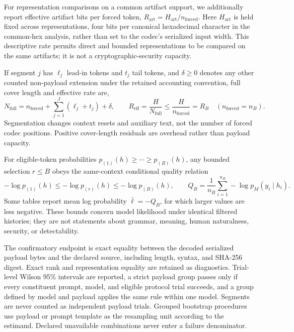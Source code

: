 \documentclass[fleqn,10pt]{wlscirep}
\begin{document}
For representation comparisons on a common artifact support, we additionally report effective artifact bits per forced token, \(R_{\mathrm{art}}=H_{\mathrm{art}}/n_{\mathrm{forced}}\). Here \(H_{\mathrm{art}}\) is held fixed across representations, four bits per canonical hexadecimal character in the common-hex analysis, rather than set to the codec's serialized input width. This descriptive rate permits direct and bounded representations to be compared on the same artifacts; it is not a cryptographic-security capacity.

If segment \(j\) has \(\ell_j\) lead-in tokens and \(t_j\) tail tokens, and \(\delta\ge0\) denotes any other counted non-payload extension under the retained accounting convention, full cover length and effective rate are,
\begin{equation}
N_{\mathrm{full}}
=n_{\mathrm{forced}}+\sum_{j=1}^{J}(\ell_j+t_j)+\delta,
\qquad
R_{\mathrm{eff}}=\frac{H}{N_{\mathrm{full}}}
\le\frac{H}{n_{\mathrm{forced}}}=R_B
\quad(n_{\mathrm{forced}}=n_B).
\label{eq:effective-rate}
\end{equation}
Segmentation changes context resets and auxiliary text, not the number of forced codec positions. Positive cover-length residuals are overhead rather than payload capacity.

For eligible-token probabilities \(p_{(1)}(h)\ge\cdots\ge p_{(B)}(h)\), any bounded selection \(r\le B\) obeys the same-context conditional quality relation
\begin{equation}
-\log p_{(1)}(h)
\le-\log p_{(r)}(h)
\le-\log p_{(B)}(h),\qquad
Q_B=\frac{1}{n_B}\sum_{i=1}^{n_B}-\log p_M(y_i\mid h_i).
\label{eq:quality-bound}
\end{equation}
Some tables report mean log probability \(\bar\ell=-Q_B\), for which larger values are less negative. These bounds concern model likelihood under identical filtered histories; they are not statements about grammar, meaning, human naturalness, security, or detectability.

The confirmatory endpoint is exact equality between the decoded serialized payload bytes and the declared source, including length, syntax, and SHA-256 digest. Exact rank and representation equality are retained as diagnostics. Trial-level Wilson 95\% intervals are reported\cite{Wilson1927Interval}, a strict payload group passes only if every constituent prompt, model, and eligible protocol trial succeeds, and a group defined by model and payload applies the same rule within one model. Segments are never counted as independent payload trials. Grouped bootstrap procedures use payload or prompt template as the resampling unit according to the estimand. Declared unavailable combinations never enter a failure denominator.
\end{document}
